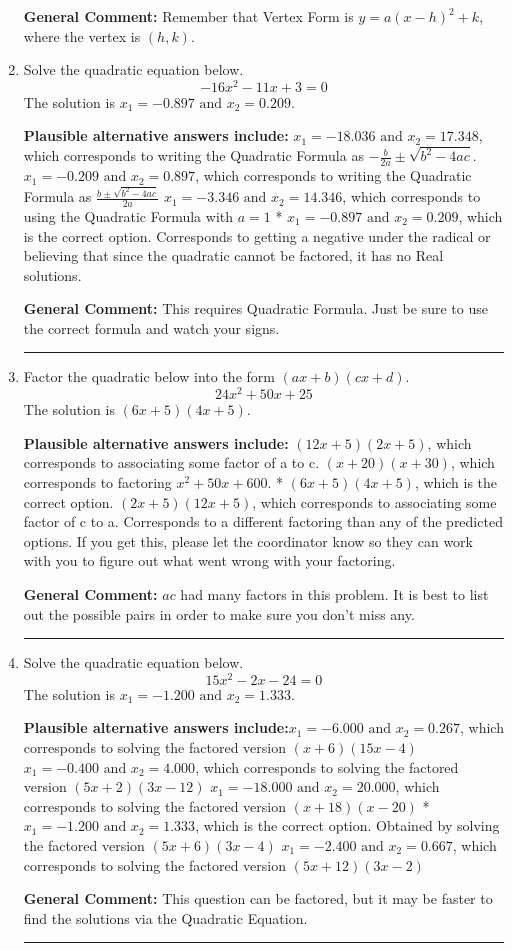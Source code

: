 \documentclass{extbook}[14pt]
\newcommand{\litem}[1]{\item #1

\rule{\textwidth}{0.4pt}}
\begin{document}
\begin{enumerate}
{\textbf{General Comment:} Remember that Vertex Form is $y = a(x-h)^2+k$, where the vertex is $(h, k)$.
}
\litem{
Solve the quadratic equation below.
\[ -16x^{2} -11 x + 3 = 0 \]The solution is \( x_1 = -0.897 \text{ and } x_2 = 0.209 \).\begin{enumerate}[label=\Alph*.]
\textbf{Plausible alternative answers include:} $x_1 = -18.036 \text{ and } x_2 = 17.348$, which corresponds to writing the Quadratic Formula as $-\frac{b}{2a} \pm \sqrt{b^2 - 4ac}$.
 $x_1 = -0.209 \text{ and } x_2 = 0.897$, which corresponds to writing the Quadratic Formula as $\frac{b \pm \sqrt{b^2 - 4ac}}{2a}$
 $x_1 = -3.346 \text{ and } x_2 = 14.346$, which corresponds to using the Quadratic Formula with $a=1$
* $x_1 = -0.897 \text{ and } x_2 = 0.209$, which is the correct option.
Corresponds to getting a negative under the radical or believing that since the quadratic cannot be factored, it has no Real solutions.
\end{enumerate}

\textbf{General Comment:} This requires Quadratic Formula. Just be sure to use the correct formula and watch your signs.
}
\litem{
Factor the quadratic below into the form $(ax+b)(cx+d)$.
\[ 24x^{2} +50 x + 25 \]The solution is \( (6x + 5)(4x + 5) \).\begin{enumerate}[label=\Alph*.]
\textbf{Plausible alternative answers include:} $(12x + 5)(2x + 5)$, which corresponds to associating some factor of a to c.
 $(x + 20)(x + 30)$, which corresponds to factoring $x^{2} +50 x + 600$.
* $(6x + 5)(4x + 5)$, which is the correct option.
 $(2x + 5)(12x + 5)$, which corresponds to associating some factor of c to a.
 Corresponds to a different factoring than any of the predicted options. If you get this, please let the coordinator know so they can work with you to figure out what went wrong with your factoring.
\end{enumerate}

\textbf{General Comment:} $ac$ had many factors in this problem. It is best to list out the possible pairs in order to make sure you don't miss any.
}
\litem{
Solve the quadratic equation below.
\[ 15x^{2} -2 x -24 = 0 \]The solution is \( x_1 = -1.200 \text{ and } x_2 = 1.333 \).\begin{enumerate}[label=\Alph*.]
\textbf{Plausible alternative answers include:}$x_1 = -6.000 \text{ and } x_2 = 0.267$, which corresponds to solving the factored version $(x + 6)(15x -4)$
$x_1 = -0.400 \text{ and } x_2 = 4.000$, which corresponds to solving the factored version $(5x + 2)(3x -12)$
$x_1 = -18.000 \text{ and } x_2 = 20.000$, which corresponds to solving the factored version $(x + 18)(x -20)$
* $x_1 = -1.200 \text{ and } x_2 = 1.333$, which is the correct option. Obtained by solving the factored version $(5x + 6)(3x -4)$
$x_1 = -2.400 \text{ and } x_2 = 0.667$, which corresponds to solving the factored version $(5x + 12)(3x -2)$
\end{enumerate}

\textbf{General Comment:} This question can be factored, but it may be faster to find the solutions via the Quadratic Equation.
}
\end{enumerate}
\end{document}
